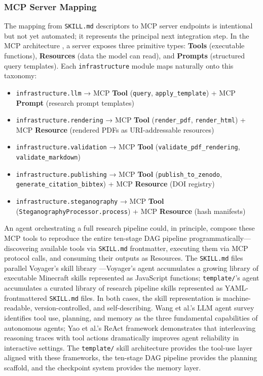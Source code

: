 \documentclass[
]{article}
\providecommand{\tightlist}{%
  \setlength{\itemsep}{0pt}\setlength{\parskip}{0pt}}
\begin{document}
\subsubsection{MCP Server Mapping}\label{mcp-server-mapping}

The mapping from \texttt{SKILL.md} descriptors to MCP server endpoints
is intentional but not yet automated; it represents the principal next
integration step. In the MCP architecture \citep{anthropic2024mcp}, a
server exposes three primitive types: \textbf{Tools} (executable
functions), \textbf{Resources} (data the model can read), and
\textbf{Prompts} (structured query templates). Each
\texttt{infrastructure} module maps naturally onto this taxonomy:

\begin{itemize}
\tightlist
\item
  \texttt{infrastructure.llm} → MCP \textbf{Tool} (\texttt{query},
  \texttt{apply\_template}) + MCP \textbf{Prompt} (research prompt
  templates)
\item
  \texttt{infrastructure.rendering} → MCP \textbf{Tool}
  (\texttt{render\_pdf}, \texttt{render\_html}) + MCP \textbf{Resource}
  (rendered PDFs as URI-addressable resources)
\item
  \texttt{infrastructure.validation} → MCP \textbf{Tool}
  (\texttt{validate\_pdf\_rendering}, \texttt{validate\_markdown})
\item
  \texttt{infrastructure.publishing} → MCP \textbf{Tool}
  (\texttt{publish\_to\_zenodo}, \texttt{generate\_citation\_bibtex}) +
  MCP \textbf{Resource} (DOI registry)
\item
  \texttt{infrastructure.steganography} → MCP \textbf{Tool}
  (\texttt{SteganographyProcessor.process}) + MCP \textbf{Resource}
  (hash manifests)
\end{itemize}

An agent orchestrating a full research pipeline could, in principle,
compose these MCP tools to reproduce the entire ten-stage DAG pipeline
programmatically---discovering available tools via \texttt{SKILL.md}
frontmatter, executing them via MCP protocol calls, and consuming their
outputs as Resources. The \texttt{SKILL.md} files parallel Voyager's
skill library \citep{wang2023voyager}---Voyager's agent accumulates a
growing library of executable Minecraft skills represented as JavaScript
functions; \texttt{template/}'s agent accumulates a curated library of
research pipeline skills represented as YAML-frontmattered
\texttt{SKILL.md} files. In both cases, the skill representation is
machine-readable, version-controlled, and self-describing. Wang et al.'s
LLM agent survey \citep{wang2024llmagents} identifies tool use,
planning, and memory as the three fundamental capabilities of autonomous
agents; Yao et al.'s ReAct framework \citep{yao2023react} demonstrates
that interleaving reasoning traces with tool actions dramatically
improves agent reliability in interactive settings. The
\texttt{template/} skill architecture provides the tool-use layer
aligned with these frameworks, the ten-stage DAG pipeline provides the
planning scaffold, and the checkpoint system provides the memory layer.
\end{document}

